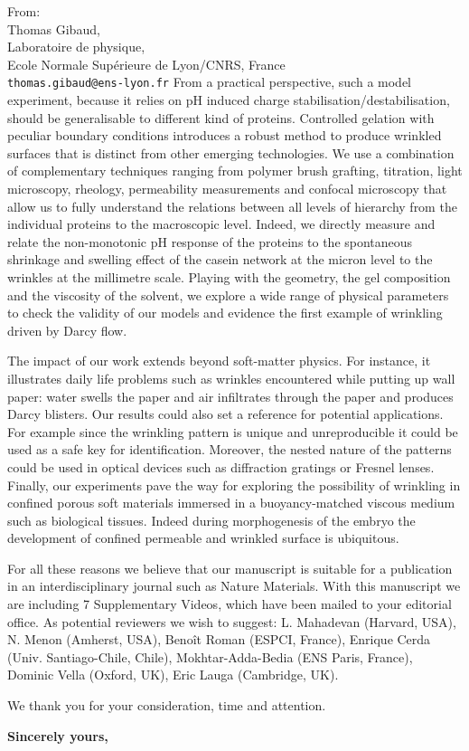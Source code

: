 \documentclass[a4paper, parskip=true, firsthead=false, fromemail=true, foldmarks=false]{scrlttr2}
\begin{document}
\begin{letter}{From:\\
Thomas Gibaud,\\
Laboratoire de physique,\\
Ecole Normale Supérieure de Lyon/CNRS, France\\
\texttt{thomas.gibaud@ens-lyon.fr}
}
From a practical perspective, such a model experiment, because it relies on pH induced charge stabilisation/destabilisation, should be generalisable to different kind of proteins. Controlled gelation with peculiar boundary conditions introduces a robust method to produce wrinkled surfaces that is distinct from other emerging technologies. We use a combination of complementary techniques ranging from polymer brush grafting, titration, light microscopy, rheology, permeability measurements and confocal microscopy that allow us to fully understand the relations between all levels of hierarchy from the individual proteins to the macroscopic level. Indeed, we directly measure and relate the non-monotonic pH response of the proteins to the spontaneous shrinkage and swelling effect of the casein network at the micron level to the wrinkles at the millimetre scale. Playing with the geometry, the gel composition and the viscosity of the solvent, we explore a wide range of physical parameters to check the validity of our models and evidence the first example of wrinkling driven by Darcy flow.


The impact of our work extends beyond soft-matter physics. For instance, it illustrates daily life problems such as wrinkles encountered while putting up wall paper: water swells the paper and air infiltrates through the paper and produces Darcy blisters. Our results could also set a reference for potential applications. For example since the wrinkling pattern is unique and unreproducible it could be used as a safe key for identification. Moreover, the nested nature of the patterns could be used in optical devices such as diffraction gratings or Fresnel lenses. Finally, our experiments pave the way for exploring the possibility of wrinkling in confined porous soft materials immersed in a buoyancy-matched viscous medium such as biological tissues. Indeed during morphogenesis of the embryo the development of confined permeable and wrinkled surface is ubiquitous.


For all these reasons we believe that our manuscript is suitable for a publication in an interdisciplinary journal such as Nature Materials. With this manuscript we are including 7 Supplementary Videos, which have been mailed to your editorial office. As potential reviewers we wish to suggest: L. Mahadevan (Harvard, USA), N. Menon (Amherst, USA), Benoît Roman (ESPCI, France), Enrique Cerda (Univ. Santiago-Chile, Chile), Mokhtar-Adda-Bedia (ENS Paris, France), Dominic Vella (Oxford, UK), Eric Lauga (Cambridge, UK).

 

We thank you for your consideration, time and attention.

\closing{\bf Sincerely yours,} 

\end{letter} 
\end{document}
